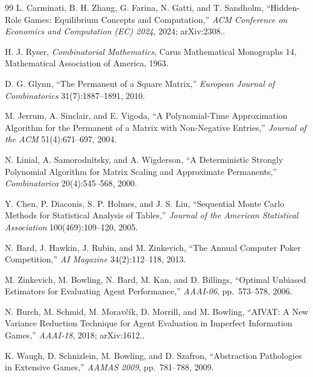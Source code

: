 \begin{thebibliography}{99}
L. Carminati, B. H. Zhang, G. Farina, N. Gatti, and T. Sandholm, ``Hidden-Role
Games: Equilibrium Concepts and Computation,'' \emph{ACM Conference on Economics
and Computation (EC) 2024}, 2024; arXiv:2308..

H. J. Ryser, \emph{Combinatorial Mathematics}, Carus Mathematical Monographs 14,
Mathematical Association of America, 1963.

D. G. Glynn, ``The Permanent of a Square Matrix,'' \emph{European Journal of
Combinatorics} 31(7):1887--1891, 2010.

M. Jerrum, A. Sinclair, and E. Vigoda, ``A Polynomial-Time Approximation
Algorithm for the Permanent of a Matrix with Non-Negative Entries,''
\emph{Journal of the ACM} 51(4):671--697, 2004.

N. Linial, A. Samorodnitsky, and A. Wigderson, ``A Deterministic Strongly
Polynomial Algorithm for Matrix Scaling and Approximate Permanents,''
\emph{Combinatorica} 20(4):545--568, 2000.

Y. Chen, P. Diaconis, S. P. Holmes, and J. S. Liu, ``Sequential Monte Carlo
Methods for Statistical Analysis of Tables,'' \emph{Journal of the American
Statistical Association} 100(469):109--120, 2005.


N. Bard, J. Hawkin, J. Rubin, and M. Zinkevich, ``The Annual Computer Poker
Competition,'' \emph{AI Magazine} 34(2):112--118, 2013.

M. Zinkevich, M. Bowling, N. Bard, M. Kan, and D. Billings, ``Optimal Unbiased
Estimators for Evaluating Agent Performance,'' \emph{AAAI-06}, pp.~573--578,
2006.

N. Burch, M. Schmid, M. Morav\v{c}\'ik, D. Morrill, and M. Bowling, ``AIVAT: A
New Variance Reduction Technique for Agent Evaluation in Imperfect Information
Games,'' \emph{AAAI-18}, 2018; arXiv:1612..

K. Waugh, D. Schnizlein, M. Bowling, and D. Szafron, ``Abstraction Pathologies
in Extensive Games,'' \emph{AAMAS 2009}, pp.~781--788, 2009.


\end{thebibliography}
